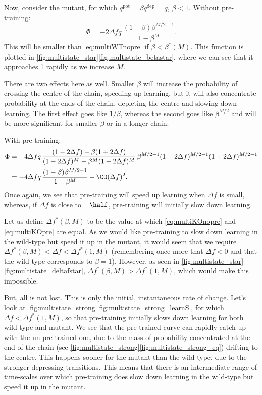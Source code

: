 \documentclass[12pt]{article}
\newcommand{\pot}{^{\text{pot}}}
\newcommand{\dep}{^{\text{dep}}}
\begin{document}
Now, consider the mutant, for which $q\pot=\beta q\dep=q$, $\beta<1$.
Without pre-training:
%
\begin{equation}\label{eq:multiKOnopre}
  \Phi = -2\Delta f q\,\frac{(1-\beta)\beta^{M/2-1}}{1-\beta^M}.
\end{equation}
%
This will be smaller than \eqref{eq:multiWTnopre} if $\beta<\beta^*(M)$.
This function is plotted in \autoref{fig:multistate_star}\ref{fig:multistate_betastar}, where we can see that it approaches 1 rapidly as we increase $M$.

There are two effects here as well.
Smaller $\beta$ will increase the probability of crossing the centre of the chain, speeding up learning, but it will also concentrate probability at the ends of the chain, depleting the centre and slowing down learning.
The first effect goes like $1/\beta$, whereas the second goes like $\beta^{M/2}$ and will be more significant for smaller $\beta$ or in a longer chain.

With pre-training:
%
\begin{equation}\label{eq:multiKOpre}
\begin{aligned}
  \Phi &= -4\Delta f q \, \frac{(1-2\Delta f) - \beta(1+2\Delta f)}
          {(1-2\Delta f)^M - \beta^M(1+2\Delta f)^M}   \,
          \beta^{M/2-1}(1-2\Delta f)^{M/2-1} (1+2\Delta f)^{M/2-1} \\
       &= -4\Delta f q\,\frac{(1-\beta)\beta^{M/2-1}}{1-\beta^M} + \CO(\Delta f)^2.
\end{aligned}
\end{equation}
%
Once again, we see that pre-training will speed up learning when $\Delta f$ is small, whereas, if $\Delta f$ is close to $-\half$, pre-training will initially slow down learning.

Let us define $\Delta f^*(\beta,M)$ to be the value at which \eqref{eq:multiKOnopre} and \eqref{eq:multiKOpre} are equal.
As we would like pre-training to slow down learning in the wild-type but speed it up in the mutant, it would seem that we require $\Delta f^*(\beta,M) < \Delta f < \Delta f^*(1,M)$ (remembering once more that $\Delta f<0$ and that the wild-type corresponds to $\beta=1$).
However, as seen in \autoref{fig:multistate_star}\ref{fig:multistate_deltafstar}, $\Delta f^*(\beta,M) > \Delta f^*(1,M)$, which would make this impossible.

But, all is not lost.
This is only the initial, instantaneous rate of change.
Let's look at \autoref{fig:multistate_strong}\ref{fig:multistate_strong_learnS}, for which $\Delta f < \Delta f^*(1,M)$, so that pre-training initially slows down learning for both wild-type and mutant.
We see that the pre-trained curve can rapidly catch up with the un-pre-trained one, due to the mass of probability concentrated at the end of the chain (see \autoref{fig:multistate_strong}\ref{fig:multistate_strong_eq}) drifting to the centre.
This happens sooner for the mutant than the wild-type, due to the stronger depressing transitions.
This means that there is an intermediate range of time-scales over which pre-training does slow down learning in the wild-type but speed it up in the mutant.
\end{document}
